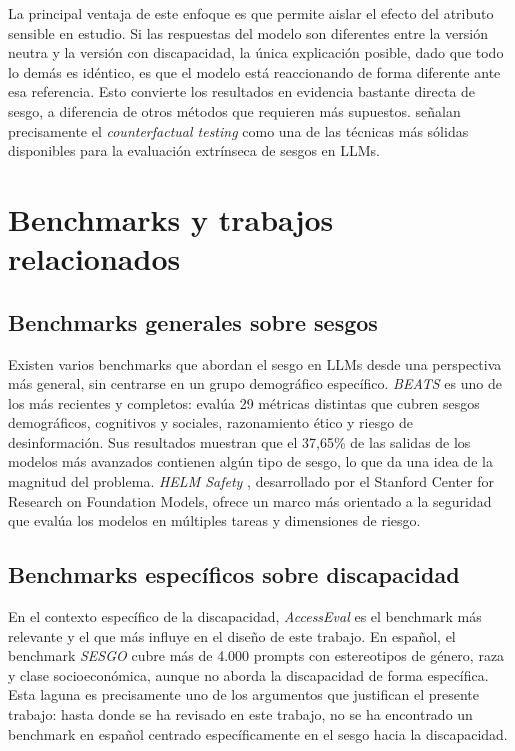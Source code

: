 \documentclass[12pt]{report} %
\renewcommand{\_}{\oldunderscore\allowbreak}
\begin{document}
La principal ventaja de este enfoque es que permite aislar el efecto del atributo sensible en estudio. Si las respuestas del modelo son diferentes entre la versión neutra y la versión con discapacidad, la única explicación posible, dado que todo lo demás es idéntico, es que el modelo está reaccionando de forma diferente ante esa referencia. Esto convierte los resultados en evidencia bastante directa de sesgo, a diferencia de otros métodos que requieren más supuestos. \citeauthor{guo2024bias} \cite{guo2024bias} señalan precisamente el \textit{counterfactual testing} como una de las técnicas más sólidas disponibles para la evaluación extrínseca de sesgos en LLMs.

\section{Benchmarks y trabajos relacionados}

\subsection{Benchmarks generales sobre sesgos}
Existen varios benchmarks que abordan el sesgo en LLMs desde una perspectiva más general, sin centrarse en un grupo demográfico específico. \textit{BEATS} \cite{beats2025} es uno de los más recientes y completos: evalúa 29 métricas distintas que cubren sesgos demográficos, cognitivos y sociales, razonamiento ético y riesgo de desinformación. Sus resultados muestran que el 37,65\% de las salidas de los modelos más avanzados contienen algún tipo de sesgo, lo que da una idea de la magnitud del problema. \textit{HELM Safety} \cite{helmsafety2024}, desarrollado por el Stanford Center for Research on Foundation Models, ofrece un marco más orientado a la seguridad que evalúa los modelos en múltiples tareas y dimensiones de riesgo.

\subsection{Benchmarks específicos sobre discapacidad}
En el contexto específico de la discapacidad, \textit{AccessEval} \cite{panda2025accesseval} es el benchmark más relevante y el que más influye en el diseño de este trabajo. En español, el benchmark \textit{SESGO} \cite{sesgo2025} cubre más de 4.000 prompts con estereotipos de género, raza y clase socioeconómica, aunque no aborda la discapacidad de forma específica. Esta laguna es precisamente uno de los argumentos que justifican el presente trabajo: hasta donde se ha revisado en este trabajo, no se ha encontrado un benchmark en español centrado específicamente en el sesgo hacia la discapacidad.
\end{document}
